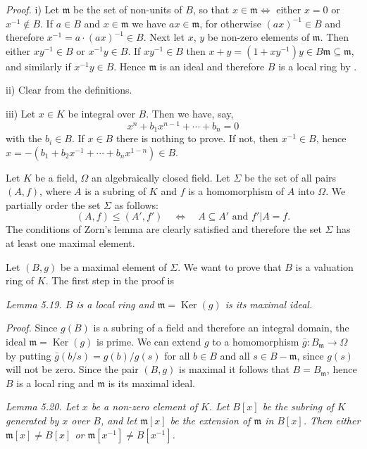 \noindent\textit{Proof.} i) Let $\mathfrak m$ be the set of non-units of $B$, so that $x\in\mathfrak m\Longleftrightarrow$ either $x=0$ or $x^{-1}\notin B$. If $a\in B$ and $x\in\mathfrak m$ we have $ax\in\mathfrak m$, for otherwise $(ax)^{-1}\in B$ and therefore $x^{-1}=a\cdot(ax)^{-1}\in B$. Next let $x$, $y$ be non-zero elements of $\mathfrak m$. Then either $xy^{-1}\in B$ or $x^{-1}y\in B$. If $xy^{-1}\in B$ then $x+y=(1+xy^{-1})y\in B\mathfrak m\subseteq\mathfrak m$, and similarly if $x^{-1}y\in B$. Hence $\mathfrak m$ is an ideal and therefore $B$ is a local ring by .

ii) Clear from the definitions.

iii) Let $x\in K$ be integral over $B$. Then we have, say,
\[
 x^n+b_1x^{n-1}+\cdots+b_n=0
\]
with the $b_i\in B$. If $x\in B$ there is nothing to prove. If not, then $x^{-1}\in B$, hence $x=-(b_1+b_2x^{-1}+\cdots+b_nx^{1-n})\in B$. \proofbox

Let $K$ be a field, $\Omega$ an algebraically closed field. Let $\Sigma$ be the set of all pairs $(A,f)$, where $A$ is a subring of $K$ and $f$ is a homomorphism of $A$ into $\Omega$. We partially order the set $\Sigma$ as follows:
\[
 (A,f)\leq(A',f')\quad\Longleftrightarrow\quad A\subseteq A'\text{ and }f'|A=f.
\]
The conditions of Zorn's lemma are clearly satisfied and therefore the set $\Sigma$ has at least one maximal element.

Let $(B,g)$ be a maximal element of $\Sigma$. We want to prove that $B$ is a valuation ring of $K$. The first step in the proof is

\noindent\textit{Lemma 5.19. $B$ is a local ring and $\mathfrak m=\operatorname{Ker}(g)$ is its maximal ideal.}

\noindent\textit{Proof.} Since $g(B)$ is a subring of a field and therefore an integral domain, the ideal $\mathfrak m=\operatorname{Ker}(g)$ is prime. We can extend $g$ to a homomorphism $\bar g:B_{\mathfrak m}\longrightarrow\Omega$ by putting $\bar g(b/s)=g(b)/g(s)$ for all $b\in B$ and all $s\in B-\mathfrak m$, since $g(s)$ will not be zero. Since the pair $(B,g)$ is maximal it follows that $B=B_{\mathfrak m}$, hence $B$ is a local ring and $\mathfrak m$ is its maximal ideal. \proofbox

\noindent\textit{Lemma 5.20. Let $x$ be a non-zero element of $K$. Let $B[x]$ be the subring of $K$ generated by $x$ over $B$, and let $\mathfrak m[x]$ be the extension of $\mathfrak m$ in $B[x]$. Then either $\mathfrak m[x]\neq B[x]$ or $\mathfrak m[x^{-1}]\neq B[x^{-1}]$.}

